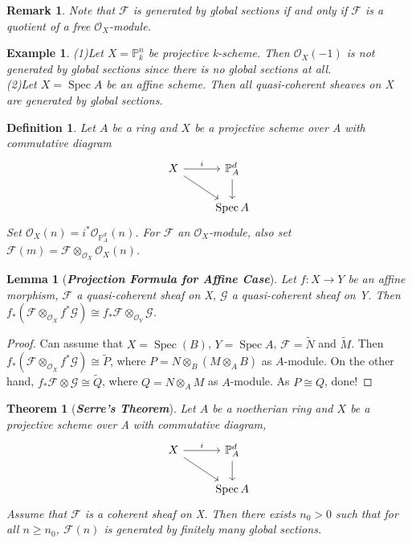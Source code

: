 \documentclass{ctexart}
\newtheorem{definition}{Definition}[section]
\newtheorem{remark}{Remark}[section]
\newtheorem{theorem}{Theorem}[section]
\newtheorem{lemma}{Lemma}[section]
\newtheorem{example}{Example}[section]
\newcommand{\spec}{\operatorname{Spec}}
\begin{document}
\begin{remark}
    Note that $\mathcal{F}$ is generated by global sections if and only if $\mathcal{F}$ is a quotient of a free $\mathcal{O}_{X}$-module.
\end{remark}
\begin{example}
    (1)Let $X = \mathbb{P}_{k}^{n}$ be projective k-scheme.
    Then $\mathcal{O}_{X}(-1)$ is not generated by global sections since there is no global sections at all. \\
    (2)Let $X = \spec A$ be an affine scheme.
    Then all quasi-coherent sheaves on X are generated by global sections.
\end{example}
\begin{definition}
    Let $A$ be a ring and $X$ be a projective scheme over A with commutative diagram
    \begin{equation*}
        \begin{tikzcd}
            X \arrow[r, "i"] \arrow[dr] &
            \mathbb{P}_{A}^{d} \arrow[d] \\
            & \spec A
        \end{tikzcd}
    \end{equation*}
    Set $\mathcal{O}_{X}(n) = i^{\ast}\mathcal{O}_{\mathbb{P}_{A}^{d}}(n)$.
    For $\mathcal{F}$ an $\mathcal{O}_{X}$-module, also set $\mathcal{F}(m) = \mathcal{F} \otimes_{\mathcal{O}_{X}} \mathcal{O}_{X}(n)$.
\end{definition}
\begin{lemma}[\textbf{\emph{Projection Formula for Affine Case}}]
    Let $f: X \longrightarrow Y$ be an affine morphism, $\mathcal{F}$ a quasi-coherent sheaf on X, $\mathcal{G}$ a quasi-coherent sheaf on Y.
    Then $f_{\ast}(\mathcal{F} \otimes_{\mathcal{O}_{X}} f^{\ast}\mathcal{G}) \cong f_{\ast}\mathcal{F} \otimes_{\mathcal{O}_{Y}} \mathcal{G}$.
    \label{Lemma 6.4}
\end{lemma}
\begin{proof}
    Can assume that $X = \spec(B)$, $Y = \spec A$, $\mathcal{F} = \widetilde{N}$ and $\widetilde{M}$.
    Then $f_{\ast}(\mathcal{F} \otimes_{\mathcal{O}_{X}} f^{\ast}\mathcal{G}) \cong \widetilde{P}$,
    where $P = N \otimes_{B} (M \otimes_{A} B)$ as $A$-module.
    On the other hand, $f_{\ast}\mathcal{F} \otimes \mathcal{G} \cong \widetilde{Q}$,
    where $Q = N \otimes_{A} M$ as $A$-module.
    As $P \cong Q$, done!
\end{proof}
\begin{theorem}[\textbf{\emph{Serre's Theorem}}]
    Let $A$ be a noetherian ring and $X$ be a projective scheme over A with commutative diagram, 
    \begin{equation*}
        \begin{tikzcd}
            X \arrow[r, "i"] \arrow[dr] &
            \mathbb{P}_{A}^{d} \arrow[d] \\
            & \spec A
        \end{tikzcd}
    \end{equation*}
    Assume that $\mathcal{F}$ is a coherent sheaf on X.
    Then there exists $n_{0} > 0$ such that for all $n \ge n_{0}$, $\mathcal{F}(n)$ is generated by finitely many global sections.
    \label{Theorem 6.3}
\end{theorem}
\end{document}
